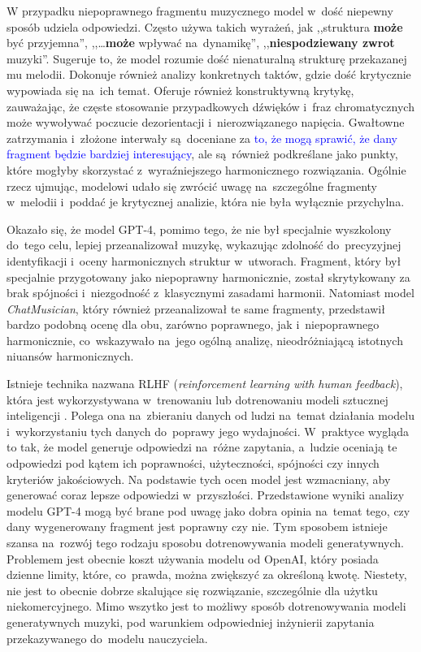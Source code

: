 \documentclass[data-science]{agh-wi} %
\begin{document}
W przypadku niepoprawnego fragmentu muzycznego model w~dość niepewny sposób udziela odpowiedzi. Często używa takich wyrażeń, jak ,,struktura \textbf{może} być przyjemna'', ,,\dots \textbf{może} wpływać na~dynamikę'', ,,\textbf{niespodziewany zwrot} muzyki''. Sugeruje to, że model rozumie dość nienaturalną strukturę przekazanej mu melodii. Dokonuje również analizy konkretnych taktów, gdzie dość krytycznie wypowiada się na~ich temat. Oferuje również konstruktywną krytykę, zauważając, że częste stosowanie przypadkowych dźwięków i~fraz chromatycznych może wywoływać poczucie dezorientacji i~nierozwiązanego napięcia. Gwałtowne zatrzymania i~złożone interwały są~doceniane za \textcolor{blue}{to, że mogą sprawić, że dany fragment będzie bardziej interesujący}, ale są~również podkreślane jako punkty, które mogłyby skorzystać z~wyraźniejszego harmonicznego rozwiązania. Ogólnie rzecz ujmując, modelowi udało się zwrócić uwagę na~szczególne fragmenty w~melodii i~poddać je krytycznej analizie, która nie była wyłącznie przychylna.

Okazało się, że model GPT-4, pomimo tego, że nie był specjalnie wyszkolony do~tego celu, lepiej przeanalizował muzykę, wykazując zdolność do~precyzyjnej identyfikacji i~oceny harmonicznych struktur w~utworach. Fragment, który był specjalnie przygotowany jako niepoprawny harmonicznie, został skrytykowany za brak spójności i~niezgodność z~klasycznymi zasadami harmonii. Natomiast model \textit{ChatMusician}, który również przeanalizował te same fragmenty, przedstawił bardzo podobną ocenę dla obu, zarówno poprawnego, jak i~niepoprawnego harmonicznie, co~wskazywało na~jego ogólną analizę, nieodróżniającą istotnych niuansów harmonicznych.

Istnieje technika nazwana RLHF (\textit{reinforcement learning with human feedback}), która jest wykorzystywana w~trenowaniu lub dotrenowaniu modeli sztucznej inteligencji \cite{rl_training}. Polega ona na~zbieraniu danych od ludzi na~temat działania modelu i~wykorzystaniu tych danych do~poprawy jego wydajności. W~praktyce wygląda to tak, że model generuje odpowiedzi na~różne zapytania, a~ludzie oceniają te odpowiedzi pod kątem ich poprawności, użyteczności, spójności czy innych kryteriów jakościowych. Na podstawie tych ocen model jest wzmacniany, aby generować coraz lepsze odpowiedzi w~przyszłości. Przedstawione wyniki analizy modelu GPT-4 mogą być brane pod uwagę jako dobra opinia na~temat tego, czy dany wygenerowany fragment jest poprawny czy nie. Tym sposobem istnieje szansa na~rozwój tego rodzaju sposobu dotrenowywania modeli generatywnych. Problemem jest obecnie koszt używania modelu od OpenAI, który posiada dzienne limity, które, co~prawda, można zwiększyć za określoną kwotę. Niestety, nie jest to obecnie dobrze skalujące się rozwiązanie, szczególnie dla użytku niekomercyjnego. Mimo wszytko jest to możliwy sposób dotrenowywania modeli generatywnych muzyki, pod warunkiem odpowiedniej inżynierii zapytania przekazywanego do~modelu nauczyciela.
\end{document}
